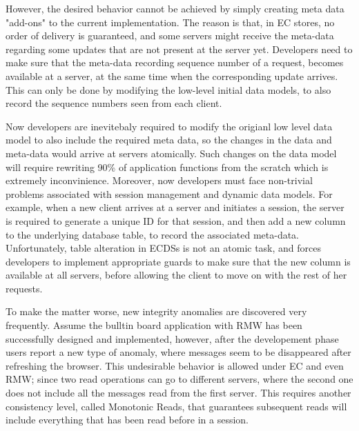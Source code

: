However, the desired behavior cannot
be achieved by simply creating meta data "add-ons" to the current implementation.
The reason is that, in EC stores, no order of delivery is guaranteed,
and some servers might receive the meta-data regarding some updates that
are not present at the server yet. 
Developers need to make sure that the meta-data recording sequence
number of a request, becomes available at a server, at the same time
when the corresponding update arrives. This can only be done by
modifying the low-level initial data models, to also record the sequence
numbers seen from each client. 
%
%

Now developers are inevitebaly required to modify the origianl low level
data model to also include the required meta data, so the changes in the
data and meta-data would arrive at servers atomically. Such changes on
the data model will require rewriting 90\% of application functions from the scratch
which is extremely inconvinience. 
Moreover, now developers must face non-trivial problems associated with
session management and dynamic data models. For example, when a new
client arrives at a server 
and initiates a session, the server is required to generate a unique ID
for that session, and then add a new column to the
underlying database table, to record the associated meta-data.
Unfortunately, table alteration in ECDSs is not an atomic task, and forces developers to implement
appropriate guards to make sure that the new column is available at all servers, before
allowing the client to move on with the rest of her requests.  
%
%

To make the matter worse, new integrity anomalies are discovered very
frequently. Assume the bulltin board application with RMW has been
successfully designed and implemented, however, after the developement
phase users report a new type of anomaly, where messages seem to be
disappeared after refreshing the browser. This undesirable behavior is
allowed under EC and even RMW; since two read operations can go to
different servers, where the second one does not include all the
messages read from the first server. This requires another consistency
level, called Monotonic Reads, that guarantees subsequent reads will
include everything that has been read before in a session.
 
 
 






